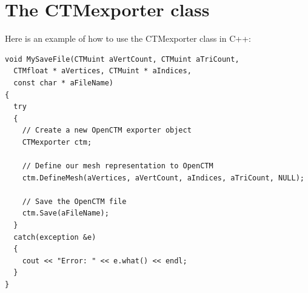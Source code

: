 \section{The CTMexporter class}
Here is an example of how to use the CTMexporter class in C++:

\begin{lstlisting}
void MySaveFile(CTMuint aVertCount, CTMuint aTriCount,
  CTMfloat * aVertices, CTMuint * aIndices,
  const char * aFileName)
{
  try
  {
    // Create a new OpenCTM exporter object
    CTMexporter ctm;

    // Define our mesh representation to OpenCTM
    ctm.DefineMesh(aVertices, aVertCount, aIndices, aTriCount, NULL);

    // Save the OpenCTM file
    ctm.Save(aFileName);
  }
  catch(exception &e)
  {
    cout << "Error: " << e.what() << endl;
  }
}
\end{lstlisting}



